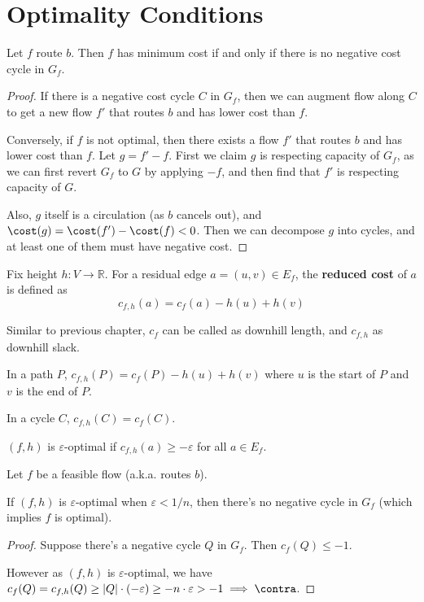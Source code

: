 \section{Optimality Conditions}

\begin{lemma}
	Let $f$ route $b$.
	Then $f$ has minimum cost if and only if there is no negative cost cycle in $G_f$.
\end{lemma}
\begin{proof}
	If there is a negative cost cycle $C$ in $G_f$, then we can augment flow along $C$ to get a new flow $f'$ that routes $b$ and has lower cost than $f$.

	Conversely, if $f$ is not optimal, then there exists a flow $f'$ that routes $b$ and has lower cost than $f$.
	Let $g = f' - f$. First we claim $g$ is respecting capacity of $G_f$, as we can first revert $G_f$ to $G$ by applying $-f$, and then find that $f'$ is respecting capacity of $G$.

	Also, $g$ itself is a circulation (as $b$ cancels out), and $\cost(g) = \cost(f') - \cost(f) < 0$.
	Then we can decompose $g$ into cycles, and at least one of them must have negative cost.
\end{proof}

\begin{definition}
	Fix height $h: V \to \mathbb{R}$.
	For a residual edge $a = (u,v)\in E_f$, the \textbf{reduced cost} of $a$ is defined as
	\[ c_{f,h}(a) = c_f(a) - h(u) + h(v) \]

	Similar to previous chapter, $c_f$ can be called as downhill length, and $c_{f,h}$ as downhill slack.

	In a path $P$, $c_{f,h}(P) = c_f(P) - h(u) + h(v)$ where $u$ is the start of $P$ and $v$ is the end of $P$.

	In a cycle $C$, $c_{f,h}(C) = c_f(C)$.
\end{definition}

\begin{definition}
	$(f,h)$ is $\varepsilon$-optimal if $c_{f,h}(a) \geq -\varepsilon$ for all $a \in E_f$.
\end{definition}

\begin{lemma} \label{lem:eps-optimal}
	Let $f$ be a feasible flow (a.k.a. routes $b$).

	If $(f,h)$ is $\varepsilon$-optimal when $\varepsilon < 1/n$, then there's no negative cycle in $G_f$ (which implies $f$ is optimal).
\end{lemma}
\begin{proof}
	Suppose there's a negative cycle $Q$ in $G_f$. Then $c_f(Q) \le -1$.

	However as $(f,h)$ is $\varepsilon$-optimal, we have $c_f(Q) = c_{f,h}(Q) \ge |Q| \cdot (-\varepsilon) \ge -n \cdot \varepsilon > -1 \implies \contra$.
\end{proof}

